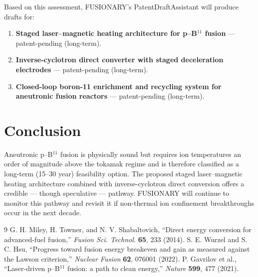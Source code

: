 \documentclass[11pt]{article}
\begin{document}
Based on this assessment, FUSIONARY's PatentDraftAssistant will
produce drafts for:

\begin{enumerate}
\item \textbf{Staged laser--magnetic heating architecture for p--B$^{11}$ fusion} --- patent-pending (long-term).
\item \textbf{Inverse-cyclotron direct converter with staged deceleration electrodes} --- patent-pending (long-term).
\item \textbf{Closed-loop boron-11 enrichment and recycling system for aneutronic fusion reactors} --- patent-pending (long-term).
\end{enumerate}

\section{Conclusion}

Aneutronic p--B$^{11}$ fusion is physically sound but requires ion
temperatures an order of magnitude above the tokamak regime and is
therefore classified as a long-term (15--30 year) feasibility option.
The proposed staged laser--magnetic heating architecture combined
with inverse-cyclotron direct conversion offers a credible --- though
speculative --- pathway. FUSIONARY will continue to monitor this
pathway and revisit it if non-thermal ion confinement breakthroughs
occur in the next decade.

\begin{thebibliography}{9}
 G. H. Miley, H. Towner, and N. V. Shabaltovich,
``Direct energy conversion for advanced-fuel fusion,'' \textit{Fusion
Sci. Technol.} \textbf{65}, 233 (2014).
 S. E. Wurzel and S. C. Hsu, ``Progress toward
fusion energy breakeven and gain as measured against the Lawson
criterion,'' \textit{Nuclear Fusion} \textbf{62}, 076001 (2022).
 P. Gavrilov et al., ``Laser-driven p--B$^{11}$
fusion: a path to clean energy,'' \textit{Nature} \textbf{599}, 477
(2021).
\end{thebibliography}
\end{document}
